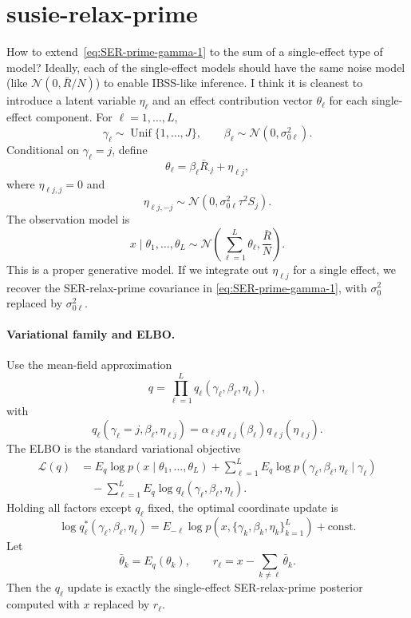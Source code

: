 \documentclass[11pt]{article}
\newcommand{\Unif}{\operatorname{Unif}}
\begin{document}
\section{susie-relax-prime}
How to extend~\eqref{eq:SER-prime-gamma-1} to the sum of a single-effect type of model? Ideally, each of the single-effect models should have the same noise model (like $\mathcal{N}(0, \bar R / N)$) to enable IBSS-like inference. I think it is cleanest to introduce a latent variable $\eta_{\ell}$ and an
effect contribution vector $\theta_\ell$ for each single-effect component.
For $\ell=1,\ldots,L$,
\[
\gamma_\ell\sim\Unif\{1,\ldots,J\},\qquad
\beta_\ell\sim\mathcal N(0,\sigma_{0\ell}^2).
\]
Conditional on $\gamma_\ell=j$, define
\[
\theta_\ell=\beta_\ell\bar R_{\cdot j}+\eta_{\ell j},
\]
where $\eta_{\ell j,j}=0$ and
\[
\eta_{\ell j,-j}\sim\mathcal N(0,\sigma_{0\ell}^2\tau^2S_j).
\]
The observation model is
\[
x\mid \theta_1,\ldots,\theta_L
\sim
\mathcal N\!\left(
\sum_{\ell=1}^L\theta_\ell,\frac{\bar R}{N}
\right).
\]
This is a proper generative model. If we integrate out $\eta_{\ell j}$ for a
single effect, we recover the SER-relax-prime covariance in
\eqref{eq:SER-prime-gamma-1}, with $\sigma_0^2$ replaced by
$\sigma_{0\ell}^2$.

\paragraph{Variational family and ELBO.}
Use the mean-field approximation
\[
q=
\prod_{\ell=1}^L
q_\ell(\gamma_\ell,\beta_\ell,\eta_\ell),
\]
with
\[
q_\ell(\gamma_\ell=j,\beta_\ell,\eta_{\ell j})
=
\alpha_{\ell j}
q_{\ell j}(\beta_\ell)
q_{\ell j}(\eta_{\ell j}).
\]
The ELBO is the standard variational objective
\begin{align}
\mathcal L(q)
&=
E_q\log p(x\mid \theta_1,\ldots,\theta_L)
+\sum_{\ell=1}^L E_q\log p(\gamma_\ell,\beta_\ell,\eta_\ell\mid\gamma_\ell)
\nonumber\\
&\quad
-\sum_{\ell=1}^L E_q\log q_\ell(\gamma_\ell,\beta_\ell,\eta_\ell).
\end{align}
Holding all factors except $q_\ell$ fixed, the optimal coordinate update is
\[
\log q_\ell^*(\gamma_\ell,\beta_\ell,\eta_\ell)
=
E_{-\ell}\log p(x,\{\gamma_k,\beta_k,\eta_k\}_{k=1}^L)+\text{const}.
\]
Let
\[
\bar\theta_k=E_q(\theta_k),\qquad
r_\ell=x-\sum_{k\ne\ell}\bar\theta_k.
\]
Then the $q_\ell$ update is exactly the single-effect SER-relax-prime posterior
computed with $x$ replaced by $r_\ell$.
\end{document}
